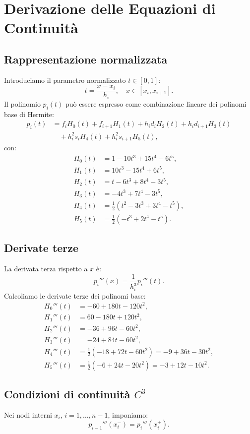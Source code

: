 \documentclass[12pt]{article}
\begin{document}
\section{Derivazione delle Equazioni di Continuità}

\subsection{Rappresentazione normalizzata}
Introduciamo il parametro normalizzato $t \in [0,1]$:
\[
t = \frac{x - x_i}{h_i}, \quad x \in [x_i, x_{i+1}].
\]
Il polinomio $p_i(t)$ può essere espresso come combinazione lineare dei polinomi base di Hermite:
\[
\begin{aligned}
p_i(t) &= f_i H_0(t) + f_{i+1} H_1(t) + h_i d_i H_2(t) + h_i d_{i+1} H_3(t) \\
&\quad + h_i^2 s_i H_4(t) + h_i^2 s_{i+1} H_5(t),
\end{aligned}
\]
con:
\[
\begin{aligned}
H_0(t) &= 1 - 10t^3 + 15t^4 - 6t^5, \\
H_1(t) &= 10t^3 - 15t^4 + 6t^5, \\
H_2(t) &= t - 6t^3 + 8t^4 - 3t^5, \\
H_3(t) &= -4t^3 + 7t^4 - 3t^5, \\
H_4(t) &= \frac{1}{2}(t^2 - 3t^3 + 3t^4 - t^5), \\
H_5(t) &= \frac{1}{2}(-t^3 + 2t^4 - t^5).
\end{aligned}
\]

\subsection{Derivate terze}
La derivata terza rispetto a $x$ è:
\[
p_i'''(x) = \frac{1}{h_i^3} p_i'''(t).
\]
Calcoliamo le derivate terze dei polinomi base:
\[
\begin{aligned}
H_0'''(t) &= -60 + 180t - 120t^2, \\
H_1'''(t) &= 60 - 180t + 120t^2, \\
H_2'''(t) &= -36 + 96t - 60t^2, \\
H_3'''(t) &= -24 + 84t - 60t^2, \\
H_4'''(t) &= \frac{1}{2}(-18 + 72t - 60t^2) = -9 + 36t - 30t^2, \\
H_5'''(t) &= \frac{1}{2}(-6 + 24t - 20t^2) = -3 + 12t - 10t^2.
\end{aligned}
\]

\subsection{Condizioni di continuità $C^3$}
Nei nodi interni $x_i$, $i=1,\dots,n-1$, imponiamo:
\[
p_{i-1}'''(x_i^-) = p_i'''(x_i^+).
\]
\end{document}
